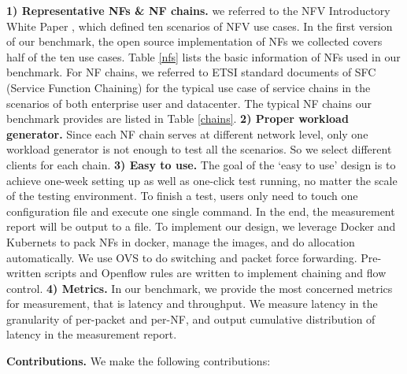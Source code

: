 \textbf{1) Representative NFs \& NF chains.}
we referred to the NFV Introductory White Paper \cite{},
which defined ten scenarios of NFV use cases.
In the first version of our benchmark,
the open source implementation of NFs we collected
covers half of the ten use cases.
Table \ref{nfs} lists the basic information of NFs used in our benchmark.
For NF chains, we referred to ETSI standard documents of SFC
(Service Function Chaining) \cite{draft-ietf-sfc-dc-use-cases-06}
for the typical use case of service chains
in the scenarios of both enterprise user and datacenter.
The typical NF chains our benchmark provides are listed in Table \ref{chains}.
\textbf{2) Proper workload generator.}
Since each NF chain serves at different network level,
only one workload generator is not enough to test all the scenarios.
So we select different clients for each chain.
\textbf{3) Easy to use.}
The goal of the `easy to use' design is to
achieve one-week setting up as well as one-click test running,
no matter the scale of the testing environment.
To finish a test, users only need to touch one configuration file
and execute one single command.
In the end, the measurement report will be output to a file.
To implement our design,
we leverage Docker and Kubernets to pack NFs in docker,
manage the images, and do allocation automatically.
We use OVS to do switching and packet force forwarding.
Pre-written scripts and Openflow rules are written
to implement chaining and flow control.
\textbf{4) Metrics.}
In our benchmark, we provide the most concerned metrics for measurement,
that is latency and throughput.
We measure latency in the granularity of per-packet and per-NF,
and output cumulative distribution of latency in the measurement report.

\textbf{Contributions.} We make the following contributions:




%
%
